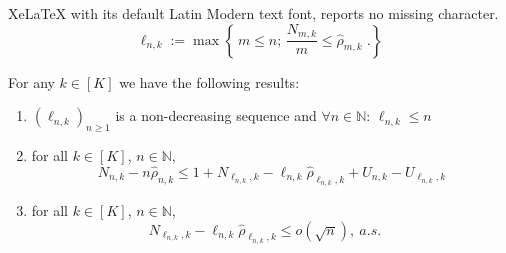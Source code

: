 \documentclass[10pt,a4paper]{amsart}
\begin{document}
XeLaTeX with its default Latin Modern text font, reports no missing character.
\begin{equation}\label{eq:stopping-time-def}
	\ell_{n,k} := \max \left\{\, m \leq n ; \, \frac{N_{m,k}}{m} \leq \hat{\rho}_{m,k}  \;.\right\}
\end{equation}

\begin{lemma}\label{lem:preliminary}
	For any \(k \in [K]\) we have the following results:
	\begin{enumerate}[label=(\roman*)]
		\item \(\left(\ell_{n,k}\right)_{n \geq 1}\) is a non-decreasing sequence and \(\forall n \in \mathbb{N}: \,\ell_{n,k} \leq n\)
		\item for all $k\in [K]$, $n \in \mathbb{N}$,\begin{equation}\label{eq:prelim-4}
			N_{n,k} - n\hat{\rho}_{n,k} \leq 1+N_{\ell_{n,k},k} - \ell_{n,k} \hat{\rho}_{\ell_{n,k},k} + U_{n,k} - U_{\ell_{n,k},k}	
		\end{equation}
		\item for all $k\in [K]$, $n \in \mathbb{N}$,
		\begin{equation}\label{eq:condition}
			N_{\ell_{n,k},k} - \ell_{n,k} \hat{\rho}_{\ell_{n,k},k} \leq o(\sqrt{n}), \ a.s.
			\quad 
		\end{equation}
	\end{enumerate}
\end{lemma}
\end{document}

